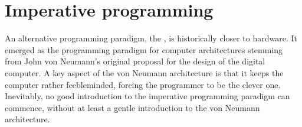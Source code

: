 \section{Imperative programming}

An alternative programming paradigm, the , is historically
closer to hardware. It emerged as the programming paradigm for computer
architectures stemming from John von Neumann's original proposal for the design
of the digital computer\cite{von-neumann}.  A key aspect of the von Neumann
architecture is that it keeps the computer rather feebleminded, forcing the
programmer to be the clever one.  Inevitably, no good introduction to the
imperative programming paradigm can commence, without at least a gentle
introduction to the von Neumann architecture.
